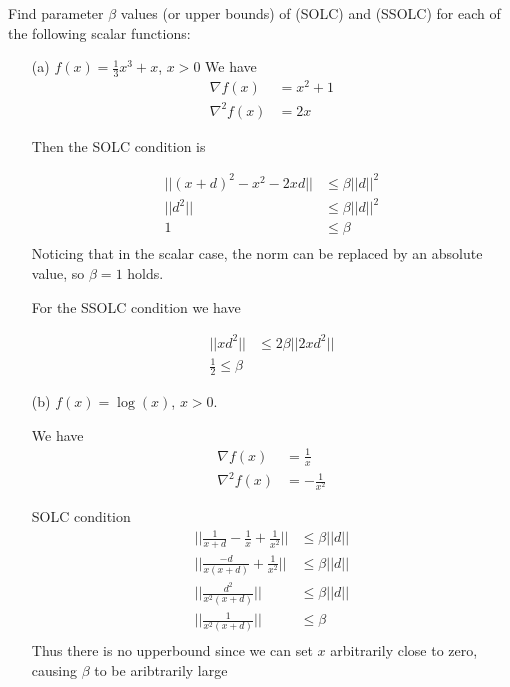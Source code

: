 \documentclass{article} %
\begin{document}
Find parameter $\beta$ values (or upper bounds)  of (SOLC) and (SSOLC) for each of the following scalar functions:
\begin{itemize}
\item[(a)] $f(x)=\frac{1}{3}x^3+x$, $x>0$
We have 
\begin{equation*}
\begin{aligned}
\nabla f(x) &= x^2 + 1 \\
\nabla^2 f(x) &= 2x
\end{aligned}
\end{equation*}

Then the SOLC condition is 

\begin{equation*}
\begin{aligned}
|| (x + d)^2 - x^2 - 2xd || &\leq \beta ||d||^2 \\ 
|| d^2 || &\leq \beta ||d||^2 \\ 
1 &\leq \beta \\ 
\end{aligned}
\end{equation*}
Noticing that in the scalar case, the norm can be replaced by an absolute value,
so $\beta = 1$ holds.

For the SSOLC condition we have

\begin{equation*}
\begin{aligned}
|| x d^2 || &\leq 2 \beta ||2xd^2|| \\ 
\frac{1}{2} \leq \beta
\end{aligned}
\end{equation*}




\item[(b)] $f(x)=\log(x)$, $x>0$.

We have 
\begin{equation*}
\begin{aligned}
\nabla f(x) &= \frac{1}{x} \\
\nabla^2 f(x) &= - \frac{1}{x^2}
\end{aligned}
\end{equation*}




SOLC condition 
\begin{equation*}
\begin{aligned}
|| \frac{1}{x +d} - \frac{1}{x} + \frac{1}{x^2} || &\leq \beta ||d|| \\ 
|| \frac{-d}{x(x +d)} + \frac{1}{x^2} || &\leq \beta ||d|| \\ 
|| \frac{d^2}{x^2(x +d)} || &\leq \beta ||d|| \\ 
|| \frac{1}{x^2(x +d)}  || &\leq \beta \\ 
\end{aligned}
\end{equation*}
Thus there is no upperbound since we can set $x$ arbitrarily close to zero, causing   $\beta$ to be aribtrarily large



\end{itemize}
\end{document}
